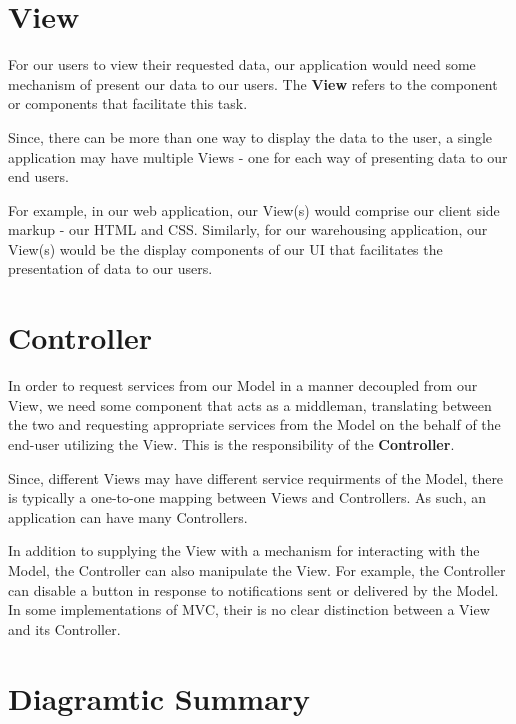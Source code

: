 \section{View}

For our users to view their requested data, our application would need some mechanism of present our data to our users. The \textbf{View} refers to the component or components that facilitate this task. 

Since, there can be more than one way to display the data to the user, a single application may have multiple Views - one for each way of presenting data to our end users.

For example, in our web application, our View(s) would comprise our client side markup - our HTML and CSS. Similarly, for our warehousing application, our View(s) would be the display components of our UI that facilitates the presentation of data to our users.

\section{Controller}

In order to request services from our Model in a manner decoupled from our View, we need some component that acts as a middleman, translating between the two and requesting appropriate services from the Model on the behalf of the end-user utilizing the View. This is the responsibility of the \textbf{Controller}.

Since, different Views may have different service requirments of the Model, there is typically a one-to-one mapping between Views and Controllers. As such, an application can have many Controllers. 

In addition to supplying the View with a mechanism for interacting with the Model, the Controller can also manipulate the View. For example, the Controller can disable a button in response to notifications sent or delivered by the Model. In some implementations of MVC, their is no clear distinction between a View and its Controller. 

\section{Diagramtic Summary}

